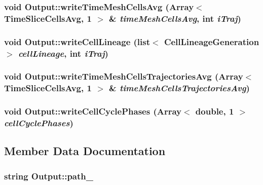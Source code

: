 \subsubsection{\setlength{\rightskip}{0pt plus 5cm}void Output::writeTimeMeshCellsAvg (Array$<$ {\bf TimeSliceCellsAvg}, 1 $>$ \& {\em timeMeshCellsAvg}, \/  int {\em iTraj})}\label{classOutput_83c90262752ea2e4b25a54779d4dc754}


\subsubsection{\setlength{\rightskip}{0pt plus 5cm}void Output::writeCellLineage (list$<$ {\bf CellLineageGeneration} $>$ {\em cellLineage}, \/  int {\em iTraj})}\label{classOutput_16624e8c9b13271f7ace2bbb217430db}


\subsubsection{\setlength{\rightskip}{0pt plus 5cm}void Output::writeTimeMeshCellsTrajectoriesAvg (Array$<$ {\bf TimeSliceCellsAvg}, 1 $>$ \& {\em timeMeshCellsTrajectoriesAvg})}\label{classOutput_8daec3ace3c03412d627af6f791332e2}


\subsubsection{\setlength{\rightskip}{0pt plus 5cm}void Output::writeCellCyclePhases (Array$<$ double, 1 $>$ {\em cellCyclePhases})}\label{classOutput_74bd96aeaab227064791019cfaa1c7ef}




\subsection{Member Data Documentation}
\subsubsection{\setlength{\rightskip}{0pt plus 5cm}string {\bf Output::path\_\-}\hspace{0.3cm}{\tt  [private]}}\label{classOutput_421d6576e8088a8a7aae27e0be78836e}



